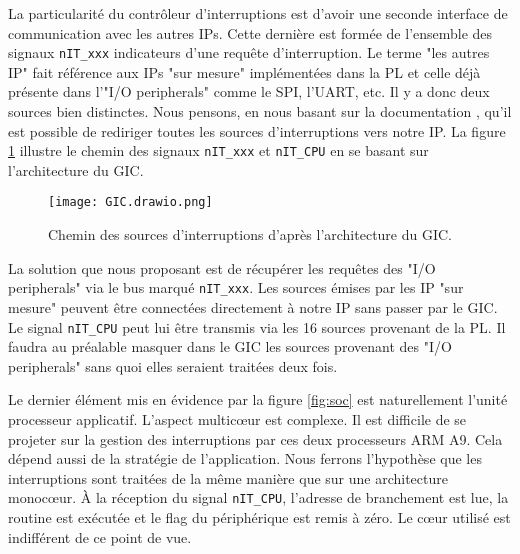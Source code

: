 \gap
La particularité du contrôleur d'interruptions est d'avoir une seconde interface de communication avec les autres IPs.
Cette dernière est formée de l'ensemble des signaux \texttt{nIT\_xxx} indicateurs d'une requête d'interruption.
Le terme "les autres IP" fait référence aux IPs "sur mesure" implémentées dans la PL et celle déjà présente dans l'"I/O peripherals" comme le SPI, l'UART, etc.
Il y a donc deux sources bien distinctes.
Nous pensons, en nous basant sur la documentation \cite{Tech_Man_Xilinx}, qu'il est possible de rediriger toutes les sources d'interruptions vers notre IP.
La figure \ref{fig:GIC} illustre le chemin des signaux \texttt{nIT\_xxx} et \texttt{nIT\_CPU} en se basant sur l'architecture du GIC.
\begin{figure}[H]
    \centering
    \texttt{[image: GIC.drawio.png]}
    \caption{Chemin des sources d'interruptions d'après l'architecture du GIC.}
    \label{fig:GIC}
\end{figure}
La solution que nous proposant est de récupérer les requêtes des "I/O peripherals" via le bus marqué \texttt{nIT\_xxx}.
Les sources émises par les IP "sur mesure" peuvent être connectées directement à notre IP sans passer par le GIC.
Le signal \texttt{nIT\_CPU} peut lui être transmis via les 16 sources provenant de la PL.
Il faudra au préalable masquer dans le GIC les sources provenant des "I/O peripherals" sans quoi elles seraient traitées deux fois.

\gap
Le dernier élément mis en évidence par la figure \ref{fig:soc} est naturellement l'unité processeur applicatif.
L'aspect multicœur est complexe.
Il est difficile de se projeter sur la gestion des interruptions par ces deux processeurs ARM A9.
Cela dépend aussi de la stratégie de l'application.
Nous ferrons l'hypothèse que les interruptions sont traitées de la même manière que sur une architecture monocœur.
À la réception du signal \texttt{nIT\_CPU}, l'adresse de branchement est lue, la routine est exécutée et le flag du périphérique est remis à zéro.
Le cœur utilisé est indifférent de ce point de vue.
